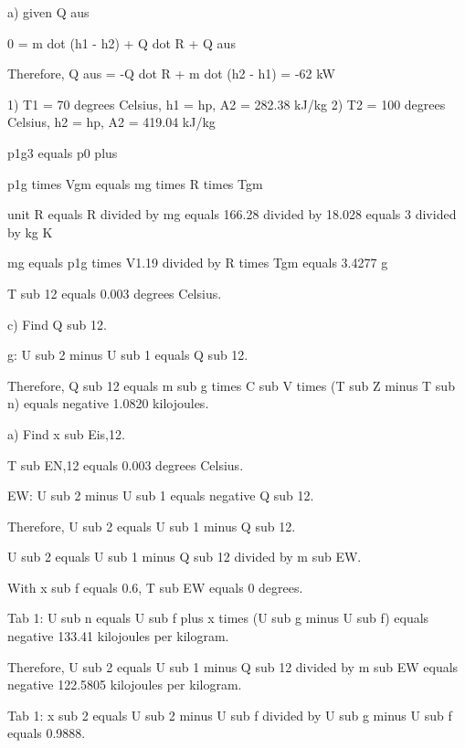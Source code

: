 a) given Q aus

0 = m dot (h1 - h2) + Q dot R + Q aus

Therefore, Q aus = -Q dot R + m dot (h2 - h1) = -62 kW

1) T1 = 70 degrees Celsius, h1 = hp, A2 = 282.38 kJ/kg
2) T2 = 100 degrees Celsius, h2 = hp, A2 = 419.04 kJ/kg

p1g3 equals p0 plus

p1g times Vgm equals mg times R times Tgm

unit R equals R divided by mg equals 166.28 divided by 18.028 equals 3 divided by kg K

mg equals p1g times V1.19 divided by R times Tgm equals 3.4277 g

T sub 12 equals 0.003 degrees Celsius.

c)
Find Q sub 12.

g:
U sub 2 minus U sub 1 equals Q sub 12.

Therefore, Q sub 12 equals m sub g times C sub V times (T sub Z minus T sub n) equals negative 1.0820 kilojoules.

a)
Find x sub Eis,12.

T sub EN,12 equals 0.003 degrees Celsius.

EW:
U sub 2 minus U sub 1 equals negative Q sub 12.

Therefore, U sub 2 equals U sub 1 minus Q sub 12.

U sub 2 equals U sub 1 minus Q sub 12 divided by m sub EW.

With x sub f equals 0.6, T sub EW equals 0 degrees.

Tab 1: U sub n equals U sub f plus x times (U sub g minus U sub f) equals negative 133.41 kilojoules per kilogram.

Therefore, U sub 2 equals U sub 1 minus Q sub 12 divided by m sub EW equals negative 122.5805 kilojoules per kilogram.

Tab 1: x sub 2 equals U sub 2 minus U sub f divided by U sub g minus U sub f equals 0.9888.